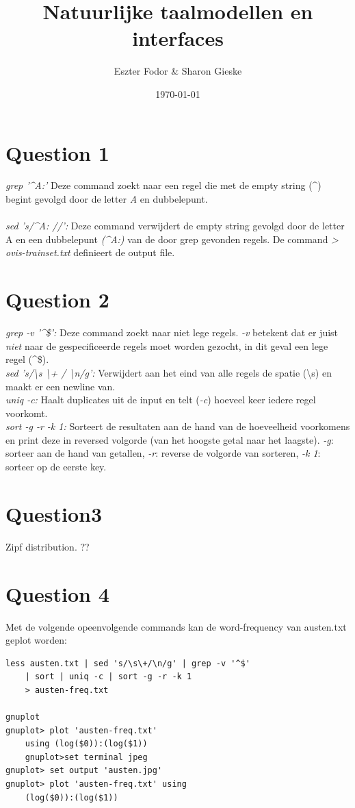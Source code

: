 \documentclass[a4paper,11pt]{article}
\begin{document}
\title{Natuurlijke taalmodellen en interfaces}
\author{Eszter Fodor \& Sharon Gieske}
\date{\today}
\maketitle

\section*{Question 1}
\textit{grep '\^{}A:'} Deze command zoekt naar een regel die met de empty string (\^{}) begint gevolgd door de letter \textit{A} en dubbelepunt.\\\\
\textit{sed 's/\^{}A: //':} Deze command verwijdert de empty string gevolgd door de letter A en een dubbelepunt \textit{(\^{}A:)} van de door grep gevonden regels. De command \textit{> ovis-trainset.txt} definieert de output file.

\section*{Question 2}
\textit{grep -v '\^{}\$':} Deze command zoekt naar niet lege regels. \textit{-v} betekent dat er juist \textit{niet} naar de gespecificeerde regels moet worden gezocht, in dit geval een lege regel (\^{}\$).\\
\textit{sed 's/\textbackslash s \textbackslash + / \textbackslash n/g':} Verwijdert aan het eind van alle regels de spatie (\textbackslash s) en maakt er een newline van. \\
\textit{uniq -c:} Haalt duplicates uit de input en telt (\textit{-c}) hoeveel keer iedere regel voorkomt. \\
\textit{sort -g -r -k 1:} Sorteert de resultaten aan de hand van de hoeveelheid voorkomens en print deze in reversed volgorde (van het hoogste getal naar het laagste). \textit{-g}: sorteer aan de hand van getallen, \textit{-r}: reverse de volgorde van sorteren, \textit{-k 1}: sorteer op de eerste key.\\

\section*{Question3}
Zipf distribution. ??

\newpage

\section*{Question 4}
Met de volgende opeenvolgende commands kan de word-frequency van austen.txt geplot worden: 
\begin{lstlisting}[frame=single]
less austen.txt | sed 's/\s\+/\n/g' | grep -v '^$' 
	| sort | uniq -c | sort -g -r -k 1 
	> austen-freq.txt
	
gnuplot
gnuplot> plot 'austen-freq.txt' 
	using (log($0)):(log($1))
	gnuplot>set terminal jpeg
gnuplot> set output 'austen.jpg'
gnuplot> plot 'austen-freq.txt' using 
	(log($0)):(log($1))
\end{lstlisting}
\end{document}
